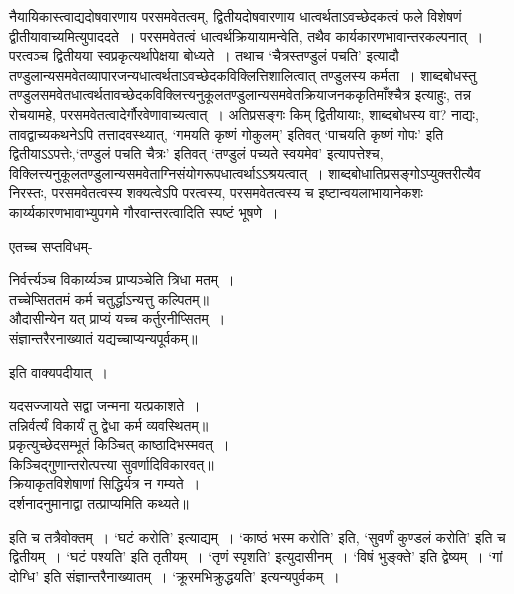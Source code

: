 {{{{ नैयायिकास्त्वाद्यदोषवारणाय परसमवेतत्वम्, द्वितीयदोषवारणाय धात्वर्थताऽवच्छेदकत्वं फले विशेषणं द्वीतीयावाच्यमित्युपाददते~।
परसमवेतत्वं धात्वर्थक्रियायामन्वेति, तथैव कार्यकारणभावान्तरकल्पनात्~।
परत्वञ्च द्वितीयया स्वप्रकृत्यर्थापेक्षया बोध्यते~। 
 तथाच `चैत्रस्तण्डुलं पचति' इत्यादौ तण्डुलान्यसमवेतव्यापारजन्यधात्वर्थताऽवच्छेदकविक्लित्तिशालित्वात् तण्डुलस्य कर्मता~।
शाब्दबोधस्तु तण्डुलसमवेतधात्वर्थतावच्छेदकविक्लित्त्यनुकूलतण्डुलान्यसमवेतक्रियाजनक\-कृतिमाँश्चैत्र इत्याहुः,
 तन्न रोचयामहे, परसमवेतत्वादेर्गौरवेणावाच्यत्वात्~।
अतिप्रसङ्गः किम् द्वितीयायाः, शाब्दबोधस्य वा? नाद्यः, तावद्वाच्यकथनेऽपि तत्तादवस्थ्यात्, `गमयति कृष्णं गोकुलम्' इतिवत् `पाचयति कृष्णं गोपः' इति द्वितीयाऽऽपत्तेः,`तण्डुलं पचति चैत्रः' इतिवत् `तण्डुलं पच्यते स्वयमेव' इत्यापत्तेश्च, विक्लित्त्यनुकूलतण्डुलान्यसमवेताग्निसंयोगरूपधात्वर्थाऽऽश्रयत्वात्~।
शाब्दबोधातिप्रसङ्गोऽप्युक्तरीत्यैव निरस्तः, परसमवेतत्वस्य शक्यत्वेऽपि परत्वस्य, परसमवेतत्वस्य च इष्टान्वयलाभायानेकशः कार्य्यकारणभावाभ्युपगमे गौरवान्तरत्वादिति स्पष्टं भूषणे~।

एतच्च सप्तविधम्-
\begin{center} निर्वर्त्त्यञ्च विकार्य्यञ्च प्राप्यञ्चेति त्रिधा मतम्~।\\
 तच्चेप्सिततमं कर्म चतुर्द्धाऽन्यत्तु कल्पितम्॥\\[10pt]
 औदासीन्येन यत् प्राप्यं यच्च कर्तुरनीप्सितम्~।\\
 संज्ञान्तरैरनाख्यातं यद्यच्चाप्यन्यपूर्वकम्॥\\
\end{center}
इति वाक्यपदीयात्~।
\begin{center} यदसज्जायते सद्वा जन्मना यत्प्रकाशते~।\\
 तन्निर्वर्त्यं विकार्यं तु द्वेधा कर्म व्यवस्थितम्॥\\[10pt]
 प्रकृत्युच्छेदसम्भूतं किञ्चित् काष्ठादिभस्मवत्~।\\
 किञ्चिद्गुणान्तरोत्पत्त्या सुवर्णादिविकारवत्॥\\[10pt]
 क्रियाकृतविशेषाणां सिद्धिर्यत्र न गम्यते~।\\
 दर्शनादनुमानाद्वा तत्प्राप्यमिति कथ्यते॥
\end{center}
इति च तत्रैवोक्तम्~।
 `घटं करोति' इत्याद्यम्~।
`काष्ठं भस्म करोति' इति, `सुवर्णं कुण्डलं करोति' इति च द्वितीयम्~।
`घटं पश्यति' इति तृतीयम्~।
`तृणं स्पृशति' इत्युदासीनम्~।
`विषं भुङ्क्ते' इति द्वेष्यम्~।
`गां दोग्धि' इति संज्ञान्तरैनाख्यातम्~।
 `क्रूरमभिक्रुद्धयति' इत्यन्यपुर्वकम्~।

}}}}
